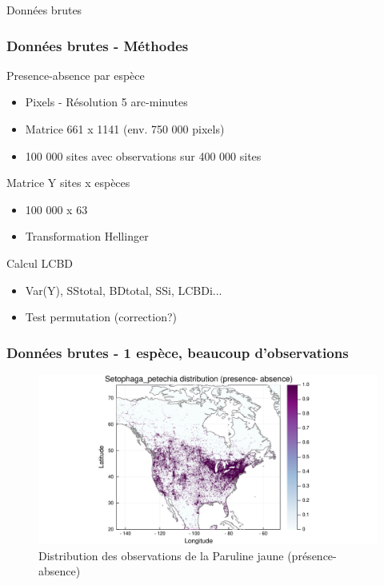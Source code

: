 \documentclass[10pt]{beamer}
\begin{document}
\begin{frame}
  \vfill
  \centering
  \huge Données brutes
  \vfill
\end{frame}

\begin{frame}
  \frametitle{Données brutes - Méthodes}
  Presence-absence par espèce
  \begin{itemize}
    \item Pixels - Résolution 5 arc-minutes
    \item Matrice 661 x 1141 (env. 750 000 pixels)
    \item 100 000 sites avec observations sur 400 000 sites
  \end{itemize}
  \medskip
  Matrice Y sites x espèces
  \begin{itemize}
    \item 100 000 x 63
    \item Transformation Hellinger
  \end{itemize}
  \medskip
  Calcul LCBD
  \begin{itemize}
    \item Var(Y), SStotal, BDtotal, SSi, LCBDi...
    \item Test permutation (correction?)
  \end{itemize}
\end{frame}

\begin{frame}
  \frametitle{Données brutes - 1 espèce, beaucoup d'observations}
  \begin{figure}
    \centering
    \hspace*{-2cm}\includegraphics[scale=0.5]{fig/raw-sp-Setophaga_petechia.pdf}
    \caption{Distribution des observations de la Paruline jaune (présence-absence)}
  \end{figure}
\end{frame}
\end{document}
